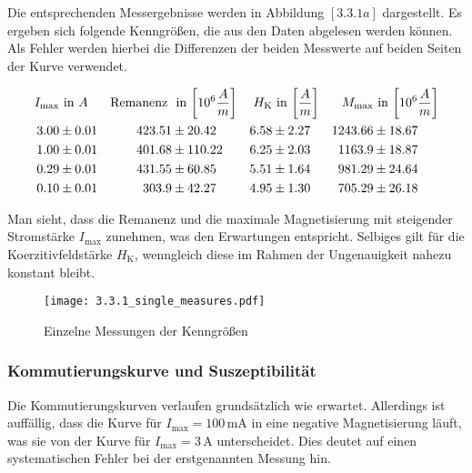 \documentclass[12pt,a4paper]{scrartcl}
\numberwithin{equation}{section} %
\renewcommand{\[}{} %
\renewcommand{\]}{\noindent} %
\begin{document}
Die entsprechenden Messergebnisse werden in Abbildung \([3.3.1a]\)
dargestellt. Es ergeben sich folgende Kenngrößen, die aus den Daten
abgelesen werden können. Als Fehler werden hierbei die Differenzen der
beiden Messwerte auf beiden Seiten der Kurve verwendet.

\[
\begin{align*}
    I_\mathrm{max} &\text{ in } A &
        \text{Remanenz } &\text{ in }
            {\tiny \left[10^6  \frac{A}{m} \right] } &
        H_\mathrm{K} &\text{ in }
            {\tiny \left[ \frac{A}{m} \right] } &
        M_\mathrm{max} &\text{ in }
            {\tiny \left[10^6 \frac{A}{m} \right] }
        \\
    3.00 &\pm 0.01 &
        423.51 &\pm 20.42 &
        6.58 &\pm 2.27 &
        1243.66 &\pm 18.67
        \\
    1.00 &\pm 0.01 &
        401.68 &\pm 110.22 &
        6.25 &\pm 2.03 &
        1163.9 &\pm 18.87
        \\
    0.29 &\pm 0.01 &
        431.55 &\pm 60.85 &
        5.51 &\pm 1.64 &
        981.29 &\pm 24.64
        \\
    0.10 &\pm 0.01 &
        303.9 &\pm 42.27 &
        4.95 &\pm 1.30 &
        705.29 &\pm 26.18
        \\
\end{align*}
\]

Man sieht, dass die Remanenz und die maximale Magnetisierung mit
steigender Stromstärke \(I_\mathrm{max}\) zunehmen, was den Erwartungen
entspricht. Selbiges gilt für die Koerzitivfeldstärke \(H_\mathrm{K}\),
wenngleich diese im Rahmen der Ungenauigkeit nahezu konstant bleibt.

\begin{figure}
\centering
\texttt{[image: 3.3.1\_single\_measures.pdf]}
\caption{Einzelne Messungen der Kenngrößen}
\end{figure}

\hypertarget{kommutierungskurve-und-suszeptibilituxe4t}{%
\subsubsection{Kommutierungskurve und
Suszeptibilität}\label{kommutierungskurve-und-suszeptibilituxe4t}}

Die Kommutierungskurven verlaufen grundsätzlich wie erwartet. Allerdings
ist auffällig, dass die Kurve für \(I_\mathrm{max}=100\mathrm{\,mA}\) in
eine negative Magnetisierung läuft, was sie von der Kurve für
\(I_\mathrm{max}= 3\,\mathrm A\) unterscheidet. Dies deutet auf einen
systematischen Fehler bei der erstgenannten Messung hin.
\end{document}
